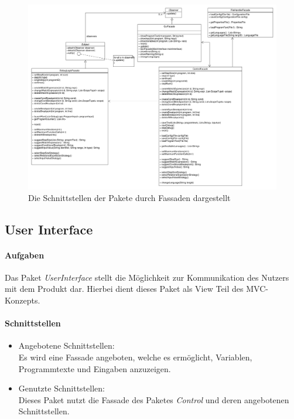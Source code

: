 \documentclass[parskip=full]{scrartcl}
\begin{document}
\begin{landscape}

\begin{figure}[!h]
\centering
\includegraphics[scale=0.4]{diagrammIdeenUmlet/fassaden.pdf}
\caption{Die Schnittstellen der Pakete durch Fassaden dargestellt}
\label{fig:fassaden}
\end{figure}
\end{landscape}

\newpage

\subsection{User Interface}
\paragraph{Aufgaben} Das Paket \textit{UserInterface} stellt die Möglichkeit zur Kommunikation des Nutzers mit dem Produkt dar. Hierbei dient dieses Paket als View Teil des MVC-Konzepts.
\paragraph{Schnittstellen} 
\begin{itemize}
\item Angebotene Schnittstellen:\\
Es wird eine Fassade angeboten, welche es ermöglicht, Variablen, Programmtexte und Eingaben anzuzeigen.
\item Genutzte Schnittstellen:\\
Dieses Paket nutzt die Fassade des Paketes \textit{Control} und deren angebotenen Schnittstellen.
\end{itemize}
\end{document}
